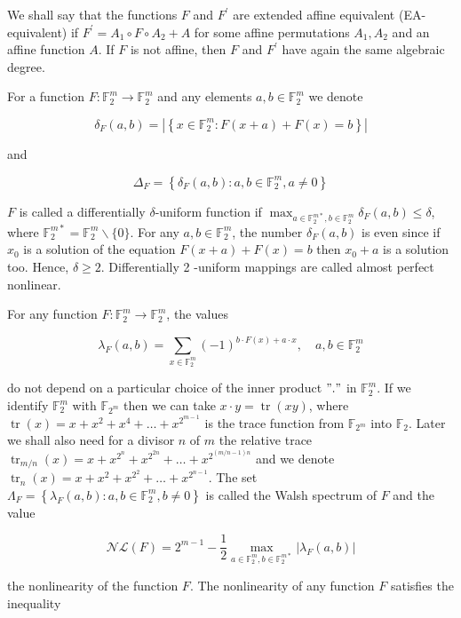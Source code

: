 \documentclass[10pt]{article}
\begin{document}
We shall say that the functions $F$ and $F^{\prime}$ are extended affine equivalent (EA-equivalent) if $F^{\prime}=A_{1} \circ F \circ A_{2}+A$ for some affine permutations $A_{1}, A_{2}$ and an affine function $A$. If $F$ is not affine, then $F$ and $F^{\prime}$ have again the same algebraic degree.

For a function $F: \mathbb{F}_{2}^{m} \rightarrow \mathbb{F}_{2}^{m}$ and any elements $a, b \in \mathbb{F}_{2}^{m}$ we denote

$$
\delta_{F}(a, b)=\left|\left\{x \in \mathbb{F}_{2}^{m}: F(x+a)+F(x)=b\right\}\right|
$$

and

$$
\Delta_{F}=\left\{\delta_{F}(a, b): a, b \in \mathbb{F}_{2}^{m}, a \neq 0\right\}
$$

$F$ is called a differentially $\delta$-uniform function if $\max _{a \in \mathbb{F}_{2}^{m *}, b \in \mathbb{F}_{2}^{m}} \delta_{F}(a, b) \leq \delta$, where $\mathbb{F}_{2}^{m *}= \mathbb{F}_{2}^{m} \backslash\{0\}$. For any $a, b \in \mathbb{F}_{2}^{m}$, the number $\delta_{F}(a, b)$ is even since if $x_{0}$ is a solution of the equation $F(x+a)+F(x)=b$ then $x_{0}+a$ is a solution too. Hence, $\delta \geq 2$. Differentially 2 -uniform mappings are called almost perfect nonlinear.

For any function $F: \mathbb{F}_{2}^{m} \rightarrow \mathbb{F}_{2}^{m}$, the values

$$
\lambda_{F}(a, b)=\sum_{x \in \mathbb{F}_{2}^{m}}(-1)^{b \cdot F(x)+a \cdot x}, \quad a, b \in \mathbb{F}_{2}^{m}
$$

do not depend on a particular choice of the inner product $" . "$ in $\mathbb{F}_{2}^{m}$. If we identify $\mathbb{F}_{2}^{m}$ with $\mathbb{F}_{2^{m}}$ then we can take $x \cdot y=\operatorname{tr}(x y)$, where $\operatorname{tr}(x)=x+x^{2}+x^{4}+\ldots+x^{2^{m-1}}$ is the trace function from $\mathbb{F}_{2^{m}}$ into $\mathbb{F}_{2}$. Later we shall also need for a divisor $n$ of $m$ the relative trace $\operatorname{tr}_{m / n}(x)=x+x^{2^{n}}+x^{2^{2 n}}+\ldots+x^{2^{(m / n-1) n}}$ and we denote $\operatorname{tr}_{n}(x)=x+x^{2}+x^{2^{2}}+\ldots+x^{2^{n-1}}$. The set $\Lambda_{F}=\left\{\lambda_{F}(a, b): a, b \in \mathbb{F}_{2}^{m}, b \neq 0\right\}$ is called the Walsh spectrum of $F$ and the value

$$
\mathcal{N} \mathcal{L}(F)=2^{m-1}-\frac{1}{2} \max _{a \in \mathbb{F}_{2}^{m}, b \in \mathbb{F}_{2}^{m *}}\left|\lambda_{F}(a, b)\right|
$$

the nonlinearity of the function $F$. The nonlinearity of any function $F$ satisfies the inequality
\end{document}
